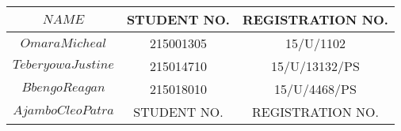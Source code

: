 \documentclass{article}
\begin{document}
\begin{tabular}{|c|c|c|}
	
	
\hline	$NAME$ & STUDENT NO. & REGISTRATION NO. \\ \hline
\hline	$Omara Micheal$ & 215001305 &15/U/1102 \\ \hline
\hline	$Teberyowa Justine$ &215014710 & 15/U/13132/PS \\ \hline
\hline	$Bbengo Reagan$ & 215018010 & 15/U/4468/PS \\ \hline
\hline	$Ajambo Cleo Patra$ & STUDENT NO. & REGISTRATION NO. \\ \hline
	
	
\end{tabular}
\end{document}
